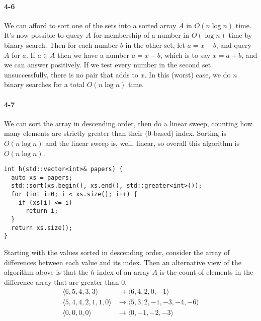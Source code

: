 \documentclass{report}
\begin{document}
\paragraph{4-6} We can afford to sort one of the sets into a sorted array $A$ in $O(n\log n)$ time. It's now possible to query $A$ for membership of a number in $O(\log n)$ time by binary search. Then for each number $b$ in the other set, let $a = x-b$, and query $A$ for $a$. If $a\in A$ then we have a number $a = x-b$, which is to say $x = a+b$, and we can answer positively. If we test every number in the second set unsuccessfully, there is no pair that adds to $x$. In this (worst) case, we do $n$ binary searches for a total $O(n\log n)$ time.

\paragraph{4-7} We can sort the array in descending order, then do a linear sweep, counting how many elements are strictly greater than their (0-based) index. Sorting is $O(n\log n)$ and the linear sweep is, well, linear, so overall this algorithm is $O(n\log n)$.

\begin{lstlisting}
int h(std::vector<int>& papers) {
  auto xs = papers;
  std::sort(xs.begin(), xs.end(), std::greater<int>());
  for (int i=0; i < xs.size(); i++) {
    if (xs[i] <= i)
      return i;
  }
  return xs.size();
}
\end{lstlisting}

Starting with the values sorted in descending order, consider the array of differences between each value and its index. Then an alternative view of the algorithm above is that the $h$-index of an array $A$ is the count of elements in the difference array that are greater than 0.
\begin{align*}
	\langle 6,5,4,3,3 \rangle &\to \langle 6,4,2,0,-1 \rangle \\
	\langle 5,4,4,2,1,1,0 \rangle &\to \langle 5,3,2,-1,-3,-4,-6 \rangle \\
	\langle 0,0,0,0 \rangle &\to \langle 0,-1,-2,-3 \rangle
\end{align*}
\end{document}
